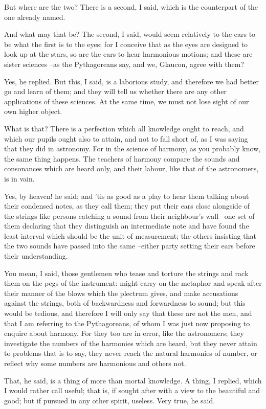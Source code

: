 But where are the two?
There is a second, I said, which is the counterpart of the one already named.

And what may that be?
The second, I said, would seem relatively to the ears to be what the first is to the eyes; for I conceive that as the eyes are designed to look up at the stars, so are the ears to hear harmonious motions; and these are sister sciences --as the Pythagoreans say, and we, Glaucon, agree with them?

Yes, he replied.
But this, I said, is a laborious study, and therefore we had better go and learn of them; and they will tell us whether there are any other applications of these sciences. At the same time, we must not lose sight of our own higher object.

What is that?
There is a perfection which all knowledge ought to reach, and which our pupils ought also to attain, and not to fall short of, as I was saying that they did in astronomy. For in the science of harmony, as you probably know, the same thing happens. The teachers of harmony compare the sounds and consonances which are heard only, and their labour, like that of the astronomers, is in vain.

Yes, by heaven! he said; and 'tis as good as a play to hear them talking about their condensed notes, as they call them; they put their ears close alongside of the strings like persons catching a sound from their neighbour's wall --one set of them declaring that they distinguish an intermediate note and have found the least interval which should be the unit of measurement; the others insisting that the two sounds have passed into the same --either party setting their ears before their understanding.

You mean, I said, those gentlemen who tease and torture the strings and rack them on the pegs of the instrument: might carry on the metaphor and speak after their manner of the blows which the plectrum gives, and make accusations against the strings, both of backwardness and forwardness to sound; but this would be tedious, and therefore I will only say that these are not the men, and that I am referring to the Pythagoreans, of whom I was just now proposing to enquire about harmony. For they too are in error, like the astronomers; they investigate the numbers of the harmonies which are heard, but they never attain to problems-that is to say, they never reach the natural harmonies of number, or reflect why some numbers are harmonious and others not.

That, he said, is a thing of more than mortal knowledge.
A thing, I replied, which I would rather call useful; that is, if sought after with a view to the beautiful and good; but if pursued in any other spirit, useless. Very true, he said.

